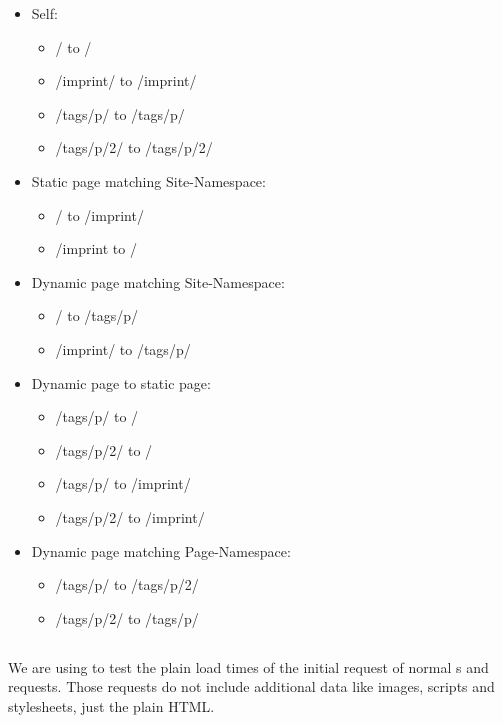 \begin{itemize}
  \item Self:
    \begin{itemize}
      \item / to /
      \item /imprint/ to /imprint/
      \item /tags/p/ to /tags/p/
      \item /tags/p/2/ to /tags/p/2/
    \end{itemize}
  \item Static page matching Site-Namespace:
    \begin{itemize}
      \item / to /imprint/
      \item /imprint to /
    \end{itemize}
  \item Dynamic page matching Site-Namespace:
    \begin{itemize}
      \item / to /tags/p/
      \item /imprint/ to /tags/p/
    \end{itemize}
  \item Dynamic page to static page:
    \begin{itemize}
      \item /tags/p/ to /
      \item /tags/p/2/ to /
      \item /tags/p/ to /imprint/
      \item /tags/p/2/ to /imprint/
    \end{itemize}
  \item Dynamic page matching Page-Namespace:
    \begin{itemize}
      \item /tags/p/ to /tags/p/2/
      \item /tags/p/2/ to /tags/p/
    \end{itemize}
\end{itemize}

\subsection{\curl{}\label{curl}}
We are using \curl{} to test the plain load times of the initial request of normal \httpRequest{}s and \lare{} requests.
Those \curl{} requests do not include additional data like images, scripts and stylesheets, just the plain HTML.

